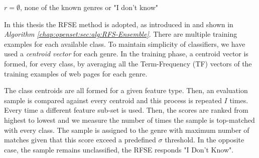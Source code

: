 \hfill

\begin{algorithm}[H][t]
\caption{The \textit{RFSE} algorithm.}\label{chap:openset:sec:alg:RFS-Ensemble}

{
      $r = \emptyset$, none of the known genres or "I don't know"\;
}
\end{algorithm}

\hfill

In this thesis the RFSE method is adopted, as introduced in \parencite{pritsos2013open} and shown in \textit{Algorithm \ref{chap:openset:sec:alg:RFS-Ensemble}}. There are multiple training examples for each available class. To maintain simplicity of classifiers, we have used a \textit{centroid vector} for each genre. In the training phase, a centroid vector is formed, for every class, by averaging all the Term-Frequency (TF) vectors of the training examples of web pages for each genre.

The class centroids are all formed for a given feature type. Then, an evaluation sample is compared against every centroid and this process is repeated $I$ times. Every time a different feature sub-set is used. Then, the scores are ranked from highest to lowest and we measure the number of times the sample is top-matched with every class. The sample is assigned to the genre with maximum number of matches given that this score exceed a predefined $\sigma$ threshold. In the opposite case, the sample remains unclassified, the RFSE responds "I Don't Know".

